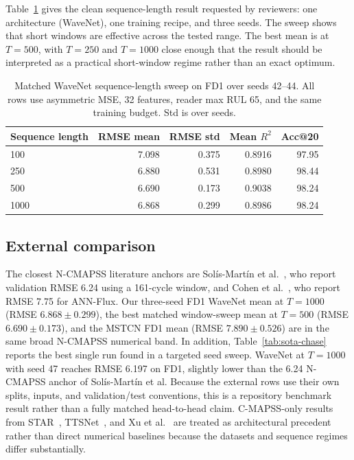 Table~\ref{tab:length} gives the clean sequence-length result requested by reviewers: one architecture (WaveNet), one training recipe, and three seeds. The sweep shows that short windows are effective across the tested range. The best mean is at $T{=}500$, with $T{=}250$ and $T{=}1000$ close enough that the result should be interpreted as a practical short-window regime rather than an exact optimum.

\begin{table}[t]
\centering
\caption{Matched WaveNet sequence-length sweep on FD1 over seeds 42--44.
  All rows use asymmetric MSE, 32 features, reader max RUL 65, and the same
  training budget. Std is over seeds.}
\label{tab:length}
\small
\begin{tabular}{lrrrr}
\toprule
Sequence length & RMSE mean & RMSE std & Mean $R^2$ & Acc@20 \\
\midrule
100 & 7.098 & 0.375 & 0.8916 & 97.95 \\
250 & 6.880 & 0.531 & 0.8980 & 98.44 \\
500 & 6.690 & 0.173 & 0.9038 & 98.24 \\
1000 & 6.868 & 0.299 & 0.8986 & 98.24 \\
\bottomrule
\end{tabular}
\end{table}

\subsection{External comparison}

The closest N-CMAPSS literature anchors are Solís-Martín et al.~\cite{solismartin2021stacked}, who report validation RMSE 6.24 using a 161-cycle window, and Cohen et al.~\cite{ncmapss_eventual2023}, who report RMSE 7.75 for ANN-Flux. Our three-seed FD1 WaveNet mean at $T{=}1000$ (RMSE $6.868\pm0.299$), the best matched window-sweep mean at $T{=}500$ (RMSE $6.690\pm0.173$), and the MSTCN FD1 mean (RMSE $7.890\pm0.526$) are in the same broad N-CMAPSS numerical band. In addition, Table~\ref{tab:sota-chase} reports the best single run found in a targeted seed sweep. WaveNet at $T{=}1000$ with seed 47 reaches RMSE 6.197 on FD1, slightly lower than the 6.24 N-CMAPSS anchor of Solís-Martín et al. Because the external rows use their own splits, inputs, and validation/test conventions, this is a repository benchmark result rather than a fully matched head-to-head claim. C-MAPSS-only results from STAR~\cite{fan2024star}, TTSNet~\cite{ttsnet2025}, and Xu et al.~\cite{xu2024msattn} are treated as architectural precedent rather than direct numerical baselines because the datasets and sequence regimes differ substantially.

